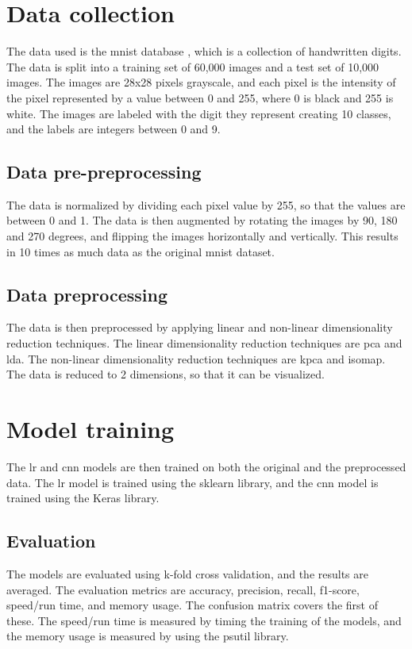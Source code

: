 \section{Data collection}\label{sec:data-collection}
The data used is the \gls{mnist} database \cite{lecun-mnist-database}, which is a collection of handwritten digits. The data is split into a training set of 60,000 images and a test set of 10,000 images. The images are 28x28 pixels grayscale, and each pixel is the intensity of the pixel represented by a value between 0 and 255, where 0 is black and 255 is white. The images are labeled with the digit they represent creating 10 classes, and the labels are integers between 0 and 9.

\subsection{Data pre-preprocessing}\label{subsec:data-pre-preprocessing}
The data is normalized by dividing each pixel value by 255, so that the values are between 0 and 1. The data is then augmented by rotating the images by 90, 180 and 270 degrees, and flipping the images horizontally and vertically. This results in 10 times as much data as the original \gls{mnist} dataset.

\subsection{Data preprocessing}\label{subsec:data-preprocessing}
The data is then preprocessed by applying linear and non-linear dimensionality reduction techniques. The linear dimensionality reduction techniques are \gls{pca} and \gls{lda}. The non-linear dimensionality reduction techniques are \gls{kpca} and \gls{isomap}. The data is reduced to 2 dimensions, so that it can be visualized.

\section{Model training}\label{sec:model-training}
The \gls{lr} and \gls{cnn} models are then trained on both the original and the preprocessed data. The \gls{lr} model is trained using the \gls{sklearn} library, and the \gls{cnn} model is trained using the Keras library.

\subsection{Evaluation}\label{subsec:evaluation}
The models are evaluated using k-fold cross validation, and the results are averaged. The evaluation metrics are accuracy, precision, recall, f1-score, speed/run time, and memory usage. The confusion matrix covers the first of these. The speed/run time is measured by timing the training of the models, and the memory usage is measured by using the psutil library.

